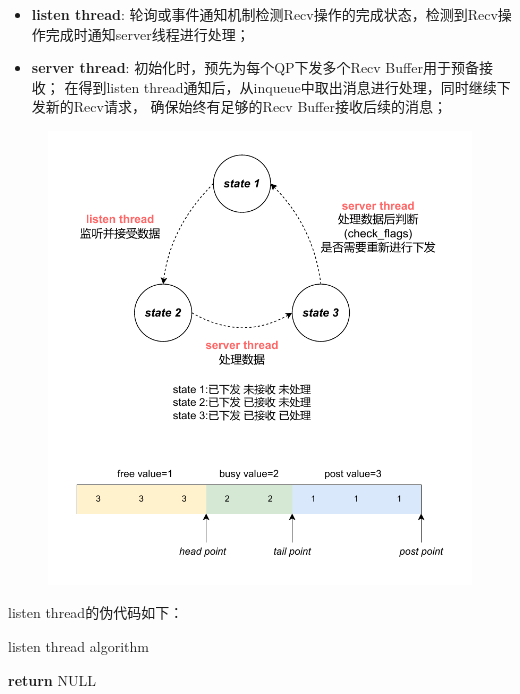 {    \begin{itemize}[leftmargin=*, nosep]
        \item \textbf{listen thread}:
              轮询或事件通知机制检测Recv操作的完成状态，检测到Recv操作完成时通知server线程进行处理；
        \item \textbf{server thread}:
              初始化时，预先为每个QP下发多个Recv Buffer用于预备接收；
              在得到listen thread通知后，从inqueue中取出消息进行处理，同时继续下发新的Recv请求，
              确保始终有足够的Recv Buffer接收后续的消息；
    \end{itemize}

    \begin{figure}[H]
        \centering
        \includegraphics[width=1.0\textwidth]{Img/recv_state.drawio.pdf}
    \end{figure}

    listen thread的伪代码如下：
    \begin{algorithm}
        \caption{listen thread algorithm}
        \begin{algorithmic}[1] %
            \State {}
            \State \textbf{return} NULL
            \EndProcedure


\end{algorithmic}
\end{algorithm}}
